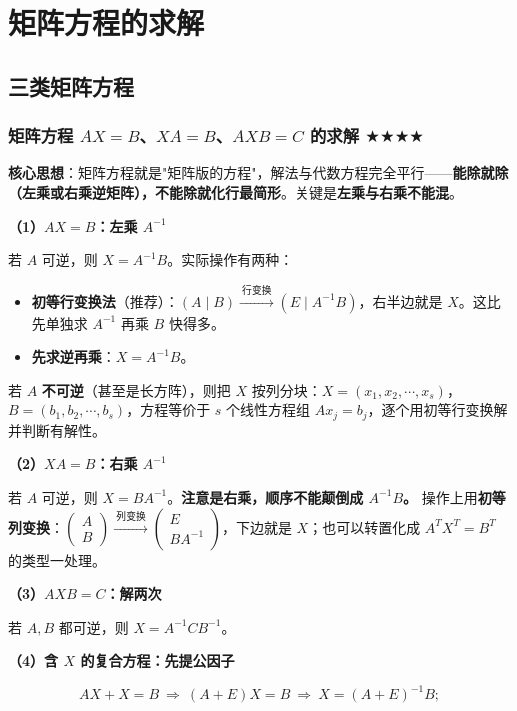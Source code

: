 \documentclass[11pt,openany,UTF8]{ctexbook}
\begin{document}
\section{矩阵方程的求解}

\subsection{三类矩阵方程}

\subsubsection{矩阵方程 $AX=B$、$XA=B$、$AXB=C$ 的求解 $\bigstar$$\bigstar$$\bigstar$$\bigstar$}

\textbf{核心思想}：矩阵方程就是"矩阵版的方程"，解法与代数方程完全平行——\textbf{能除就除（左乘或右乘逆矩阵），不能除就化行最简形}。关键是\textbf{左乘与右乘不能混}。

\textbf{（1）$AX=B$：左乘 $A^{-1}$}

若 $A$ 可逆，则 $X=A^{-1}B$。实际操作有两种：

\begin{itemize}
\item \textbf{初等行变换法}（推荐）：$(A\mid B)\xrightarrow{\ \text{行变换}\ }(E\mid A^{-1}B)$，右半边就是 $X$。这比先单独求 $A^{-1}$ 再乘 $B$ 快得多。
\item \textbf{先求逆再乘}：$X=A^{-1}B$。
\end{itemize}
若 $A$ \textbf{不可逆}（甚至是长方阵），则把 $X$ 按列分块：$X=(x_1,x_2,\cdots,x_s)$，$B=(b_1,b_2,\cdots,b_s)$，方程等价于 $s$ 个线性方程组 $Ax_j=b_j$，逐个用初等行变换解并判断有解性。

\textbf{（2）$XA=B$：右乘 $A^{-1}$}

若 $A$ 可逆，则 $X=BA^{-1}$。\textbf{注意是右乘，顺序不能颠倒成 $A^{-1}B$。} 操作上用\textbf{初等列变换}：$\begin{pmatrix}A\\B\end{pmatrix}\xrightarrow{\ \text{列变换}\ }\begin{pmatrix}E\\BA^{-1}\end{pmatrix}$，下边就是 $X$；也可以转置化成 $A^TX^T=B^T$ 的类型一处理。

\textbf{（3）$AXB=C$：解两次}

若 $A,B$ 都可逆，则 $X=A^{-1}CB^{-1}$。

\textbf{（4）含 $X$ 的复合方程：先提公因子}

\[AX+X=B\ \Longrightarrow\ (A+E)X=B\ \Longrightarrow\ X=(A+E)^{-1}B;\]
\end{document}
